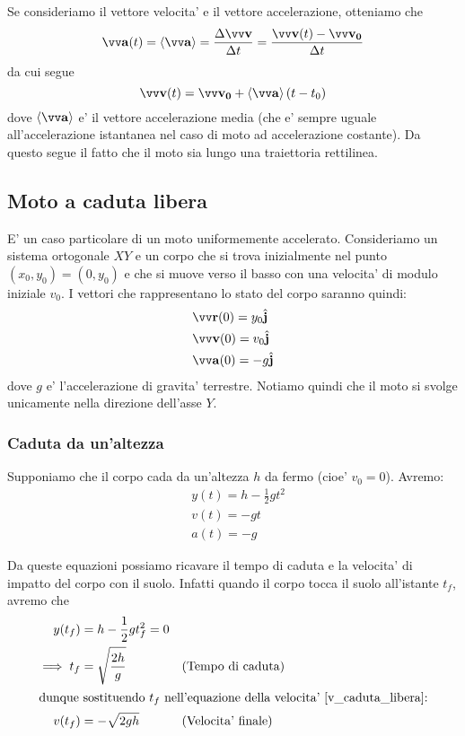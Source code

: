 Se consideriamo il vettore velocita' e il vettore accelerazione, otteniamo che
\[\bvv{a}(t) = \ang{\bvv{a}} = \frac{\Delta \bvv{v}}{\Delta t} = \frac{\bvv{v}(t) - \bvv{v_0}}{\Delta t}\]
da cui segue
\[\bvv{v}(t) = \bvv{v_0} + \ang{\bvv{a}}(t - t_0)\]
dove $\ang{\bvv{a}}$ e' il vettore accelerazione media (che e' sempre uguale all'accelerazione 
istantanea nel caso di moto ad accelerazione costante).
Da questo segue il fatto che il moto sia lungo una traiettoria rettilinea.


\subsection{Moto a caduta libera}
E' un caso particolare di un moto uniformemente accelerato. Consideriamo un sistema ortogonale $XY$ e un corpo
che si trova inizialmente nel punto $(x_0, y_0) = (0, y_0)$ e che si muove verso il basso con una velocita' di modulo iniziale $v_0$. 
I vettori che rappresentano lo stato del corpo saranno quindi:
\begin{subequations}
\begin{align}
    &\bvv{r}(0) = y_0\bh{j}\\
    &\bvv{v}(0) = v_0\bh{j}\\
    &\bvv{a}(0) = -g\bh{j}
\end{align}    
\end{subequations}
dove $g$ e' l'accelerazione di gravita' terrestre.
Notiamo quindi che il moto si svolge unicamente nella direzione dell'asse $Y$.

\subsubsection{Caduta da un'altezza}
Supponiamo che il corpo cada da un'altezza $h$ da fermo (cioe' $v_0 = 0$).
Avremo:
\begin{subequations}
\begin{align}
    &y(t) = h - \frac{1}{2}gt^2 \\
    &v(t) = -gt \label{v_caduta_libera}\\
    &a(t) = -g
\end{align}    
\end{subequations}

Da queste equazioni possiamo ricavare il tempo di caduta e la velocita' di impatto del corpo con il suolo.
Infatti quando il corpo tocca il suolo all'istante $t_f$, avremo che
\begin{alignat}{2}
          y(t_f) &= h - \frac{1}{2}gt_f^2 = 0    \nonumber\\
    \implies t_f &= \sqrt{\frac{2h}{g}}             &\rlap{\text{(Tempo di caduta)}}\\
    \intertext{dunque sostituendo $t_f$ nell'equazione della velocita' \ref{v_caduta_libera}:}
          v(t_f) &= -\sqrt{2gh}                  &\rlap{\text{(Velocita' finale)}}
\end{alignat}    


